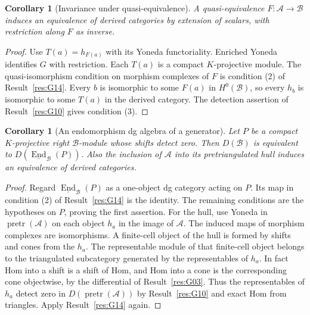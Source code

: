 \documentclass[11pt,oneside,openany]{book}
\newtheorem{corollary}[theorem]{Corollary}
\theoremstyle{definition}
\theoremstyle{remark}
\begin{document}
\begin{corollary}[Invariance under quasi-equivalence]\label{res:G15}
A quasi-equivalence \(F:\mathcal A\to\mathcal B\) induces an
equivalence of derived categories by extension of scalars, with
restriction along \(F\) as inverse.
\end{corollary}
\begin{proof}
Use \(T(a)=h_{F(a)}\) with its Yoneda functoriality. Enriched Yoneda
identifies \(G\) with restriction. Each \(T(a)\) is a compact
\(K\)-projective module. The quasi-isomorphism condition on
morphism complexes of \(F\) is condition (2) of
Result~\ref{res:G14}. Every \(b\) is isomorphic to some \(F(a)\)
in \(H^0(\mathcal B)\), so every \(h_b\) is isomorphic to
some \(T(a)\) in the derived category. The detection assertion
of Result~\ref{res:G10} gives condition (3).
\end{proof}

\begin{corollary}[An endomorphism dg algebra of a generator]\label{res:G16}
Let \(P\) be a compact \(K\)-projective right \(\mathcal B\)-module
whose shifts detect zero. Then \(D(\mathcal B)\) is equivalent
to \(D(\underline{\operatorname{End}}_\mathcal B(P))\).
Also the inclusion of \(\mathcal A\) into its pretriangulated
hull induces an equivalence of derived categories.
\end{corollary}
\begin{proof}
Regard \(\underline{\operatorname{End}}_\mathcal B(P)\) as a
one-object dg category acting on \(P\). Its map in condition (2)
of Result~\ref{res:G14} is the identity. The remaining conditions
are the hypotheses on \(P\), proving the first assertion.
For the hull, use Yoneda in \(\operatorname{pretr}(\mathcal A)\)
on each object \(h_a\) in the image of \(\mathcal A\).
The induced maps of morphism complexes are isomorphisms.
A finite-cell object of the hull is formed by shifts and cones
from the \(h_a\). The representable module of that finite-cell
object belongs to the triangulated subcategory generated by
the representables of \(h_a\). In fact Hom into a shift is a
shift of Hom, and Hom into a cone is the corresponding cone
objectwise, by the differential of Result~\ref{res:G03}.
Thus the representables of \(h_a\) detect zero in
\(D(\operatorname{pretr}(\mathcal A))\) by Result~\ref{res:G10}
and exact Hom from triangles. Apply Result~\ref{res:G14} again.
\end{proof}
\end{document}

